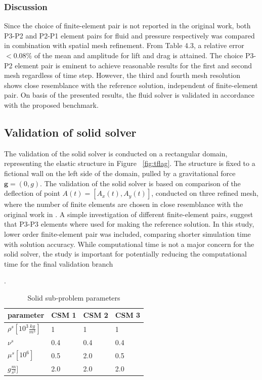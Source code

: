 \subsubsection*{Discussion}
Since the choice of finite-element pair is not reported in the original work, both P3-P2 and P2-P1 element pairs for fluid and pressure respectively was compared in combination with spatial mesh refinement. From Table 4.3, a relative error $ < 0.08\%$ of the mean and amplitude for lift and drag is attained. The choice P3-P2 element pair is eminent to achieve reasonable results for the first and second mesh regardless of time step.  However, the third and fourth mesh resolution shows close resemblance with the reference solution, independent of finite-element pair. On basis of the presented results, the fluid solver is validated in accordance with the proposed benchmark. 

\subsection{Validation of solid solver}
The validation of the solid solver is conducted on a rectangular domain, representing the elastic structure in Figure ~\ref{fig:tflag}.  The structure is fixed to a fictional wall on the left side of the domain, pulled by a gravitational force $\mathbf{g} = (0, g)$. The validation of the solid solver is based on comparison of the deflection of point $A(t) = [A_x(t), A_y(t)]$,  conducted on three refined mesh, where the number of finite elements are chosen in close resemblance with the original work in \cite{Hron2006}. A simple investigation of different finite-element pairs, suggest that P3-P3 elements where used for making the reference solution. In this study, lower order finite-element pair was included, comparing shorter simulation time with solution accuracy. While computational time is not a major concern for the solid solver, the study is important for potentially reducing the computational time for the final validation branch

\begin{table}[h!]
\centering.
\label{my-label}
\begin{tabular}{ |p{3cm}||p{2cm}|p{2cm}|p{2cm}|  }
 \hline
 parameter              & CSM 1 & CSM 2 & CSM 3 \\
 \hline
$\rho^s [10^{3}\frac{kg}{m^3}]$ & 1    & 1    & 1    \\
$\nu^s $  & 0.4    & 0.4    & 0.4    \\
$\mu^s  [10^{6}]$  & 0.5    & 2.0    & 0.5    \\
$g  \frac{m}{s^2}]$  & 2.0    & 2.0    & 2.0    \\
\hline
\end{tabular}
\caption{Solid sub-problem parameters}
\end{table}

